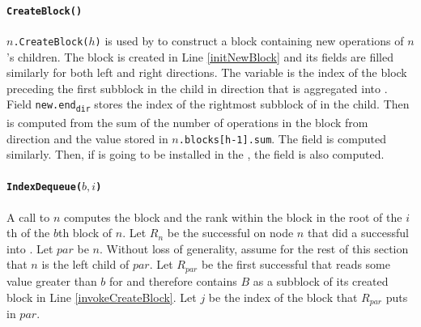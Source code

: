\paragraph{\tt{CreateBlock()}} \texttt{$n$.CreateBlock($h$)} is used
by  to construct a block containing new operations of
$n$'s children. 
The block  is created in Line \ref{initNewBlock} and its
fields are filled similarly for both left and right directions. The
variable   is the index of the block preceding the
first subblock in the child in direction  that is aggregated
into . Field \texttt{new.end\textsubscript{dir}} stores the
index of the rightmost subblock of  in the child. Then
 is computed from the sum of the number of
 operations in the  block from direction 
and the value stored in \texttt{$n$.blocks[h-1].sum}. The
field  is computed similarly. Then, if 
is going to be installed in the , the  field is also
computed. 

\paragraph{\tt{IndexDequeue($b,i$)}}

A call to $n$ computes the block and the rank
within the block in the root of the $i$th  of the $b$th
block of $n$. Let $R_n$ be the successful   on node $n$
that did a successful  into . Let
$par$ be $n$. Without loss of generality, assume for the
rest of this section that ${n}$ is the left child of $par$. Let
$R_{par}$ be the first successful  that reads some
value greater than ${b}$ for  and therefore contains
${B}$ as a subblock of its created block in Line
\ref{invokeCreateBlock}. Let $j$ be the index of the block that
$R_{par}$ puts in $par$. 
 
